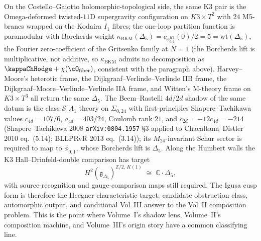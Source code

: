 On the Costello--Gaiotto holomorphic-topological side, the same K3
pair is the Omega-deformed twisted-$11$D supergravity configuration
on $K3\times T^2$ with $24$ M5-branes wrapped on the Kodaira $I_1$
fibres; the one-loop partition function is paramodular with Borcherds
weight $\kappa_{\mathrm{BKM}}(\Delta_5) = c_{\phi_{0,1}^{K3}}(0)/2
= 5 = \mathrm{wt}(\Delta_5)$, the Fourier zero-coefficient of the
Gritsenko family at $N=1$ (the Borcherds lift is
multiplicative, not additive, so $\kappa_{\mathrm{BKM}}$ admits no
decomposition as $\kappaChHodge + \chi(\cO_{\mathrm{fiber}})$,
consistent with the paragraph above).
Harvey--Moore's heterotic frame, the Dijkgraaf--Verlinde--Verlinde
IIB frame, the Dijkgraaf--Moore--Verlinde--Verlinde IIA frame, and
Witten's M-theory frame on $K3\times T^3$ all return the same
$\Delta_5$. The Beem--Rastelli $4d/2d$ shadow of the same datum is
the class-$\mathcal{S}$ $A_1$ theory on $\Sigma_{0,24}$ with
first-principles Shapere--Tachikawa values $c_{4d} = 107/6$,
$a_{4d} = 403/24$, Coulomb rank $21$, and
$c_{2d} = -12 c_{4d} = -214$ (Shapere--Tachikawa 2008
\texttt{arXiv:0804.1957} \S 3 applied to Chacaltana--Distler 2010
eq.~(5.14); BLLPRvR 2013 eq.~(3.14)); its
$M_{24}$-invariant Schur sector is required to map to
$\phi_{0,1}$, whose Borcherds lift is $\Delta_5$. Along the Humbert
walls the K3 Hall--Drinfeld-double comparison has target
\[
H^2(\mathfrak{g}_{\Delta_5})^{\mathbb{Z}/2,\,K(1)}
\;\cong\;
\mathbb{C}\cdot \Delta_5,
\]
with source-recognition and gauge-comparison maps still required.
The Igusa cusp form is therefore the Heegner-characteristic target:
candidate obstruction class, automorphic output, and conditional
Vol~III answer to the Vol~II composition problem. This is the point
where Volume~I's shadow lens, Volume~II's composition machine, and
Volume~III's origin story have a common classifying line.


